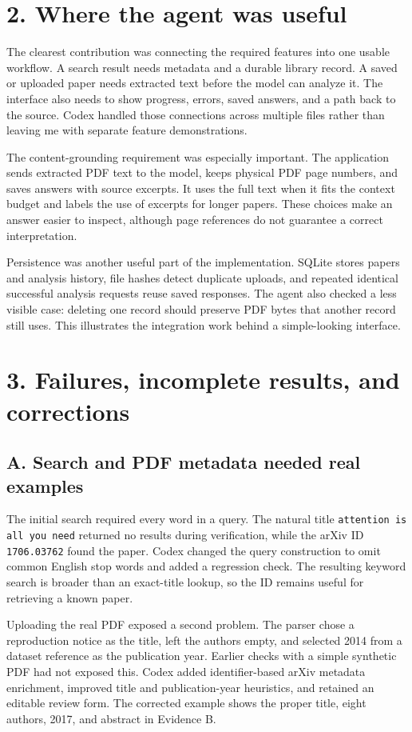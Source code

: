 \documentclass[10pt,letterpaper]{article}
\newcommand{\reportsection}[1]{\section*{\color{black}#1}}
\newcommand{\reportsubsection}[1]{\subsection*{\color{black}#1}}
\begin{document}
\reportsection{2. Where the agent was useful}

The clearest contribution was connecting the required features into one usable workflow. A search result needs metadata and a durable library record. A saved or uploaded paper needs extracted text before the model can analyze it. The interface also needs to show progress, errors, saved answers, and a path back to the source. Codex handled those connections across multiple files rather than leaving me with separate feature demonstrations.

The content-grounding requirement was especially important. The application sends extracted PDF text to the model, keeps physical PDF page numbers, and saves answers with source excerpts. It uses the full text when it fits the context budget and labels the use of excerpts for longer papers. These choices make an answer easier to inspect, although page references do not guarantee a correct interpretation.

Persistence was another useful part of the implementation. SQLite stores papers and analysis history, file hashes detect duplicate uploads, and repeated identical successful analysis requests reuse saved responses. The agent also checked a less visible case: deleting one record should preserve PDF bytes that another record still uses. This illustrates the integration work behind a simple-looking interface.

\reportsection{3. Failures, incomplete results, and corrections}

\reportsubsection{A. Search and PDF metadata needed real examples}

The initial search required every word in a query. The natural title \texttt{attention is all you need} returned no results during verification, while the arXiv ID \texttt{1706.03762} found the paper. Codex changed the query construction to omit common English stop words and added a regression check. The resulting keyword search is broader than an exact-title lookup, so the ID remains useful for retrieving a known paper.

Uploading the real PDF exposed a second problem. The parser chose a reproduction notice as the title, left the authors empty, and selected 2014 from a dataset reference as the publication year. Earlier checks with a simple synthetic PDF had not exposed this. Codex added identifier-based arXiv metadata enrichment, improved title and publication-year heuristics, and retained an editable review form. The corrected example shows the proper title, eight authors, 2017, and abstract in Evidence B.
\end{document}
